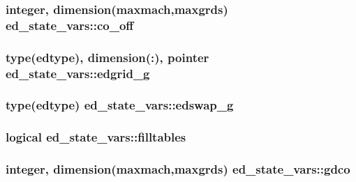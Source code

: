\subsubsection[{\texorpdfstring{co\+\_\+off}{co_off}}]{\setlength{\rightskip}{0pt plus 5cm}integer, dimension(maxmach,maxgrds) ed\+\_\+state\+\_\+vars\+::co\+\_\+off}\hypertarget{namespaceed__state__vars_abb0498b9e5f1a7195d6260a97973b89f}{}\label{namespaceed__state__vars_abb0498b9e5f1a7195d6260a97973b89f}
\subsubsection[{\texorpdfstring{edgrid\+\_\+g}{edgrid_g}}]{\setlength{\rightskip}{0pt plus 5cm}type({\bf edtype}), dimension(\+:), pointer ed\+\_\+state\+\_\+vars\+::edgrid\+\_\+g}\hypertarget{namespaceed__state__vars_a1ad47f9c446f02cad8b7a7a2bce06c8a}{}\label{namespaceed__state__vars_a1ad47f9c446f02cad8b7a7a2bce06c8a}
\subsubsection[{\texorpdfstring{edswap\+\_\+g}{edswap_g}}]{\setlength{\rightskip}{0pt plus 5cm}type({\bf edtype}) ed\+\_\+state\+\_\+vars\+::edswap\+\_\+g}\hypertarget{namespaceed__state__vars_a42ec67e3b97c2e4abb244b7ec1e7f4c2}{}\label{namespaceed__state__vars_a42ec67e3b97c2e4abb244b7ec1e7f4c2}
\subsubsection[{\texorpdfstring{filltables}{filltables}}]{\setlength{\rightskip}{0pt plus 5cm}logical ed\+\_\+state\+\_\+vars\+::filltables}\hypertarget{namespaceed__state__vars_a5f3e4a557e76387c621a3dddd988ff01}{}\label{namespaceed__state__vars_a5f3e4a557e76387c621a3dddd988ff01}
\subsubsection[{\texorpdfstring{gdco}{gdco}}]{\setlength{\rightskip}{0pt plus 5cm}integer, dimension(maxmach,maxgrds) ed\+\_\+state\+\_\+vars\+::gdco}\hypertarget{namespaceed__state__vars_a4fc7c00baa15ee35e1703f12faa7fae2}{}\label{namespaceed__state__vars_a4fc7c00baa15ee35e1703f12faa7fae2}
